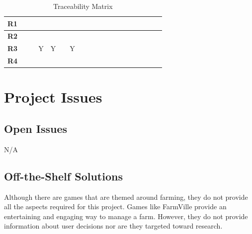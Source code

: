 \documentclass{article}
\begin{document}
\begin{table}[H]
\begin{adjustwidth}{-1.87in}{-1in}
\begin{tabular}{c|c|c|c|c|c|c|c|c|c|c|c|c|c|c|c|c|c|c|}
\multicolumn{1}{|c|}{\textbf{R1}}   &              &              &              &              &              &              &              &              &              &              &              &              &              &              &             &             &             &             \\ \hline
\multicolumn{1}{|c|}{\textbf{R2}}   &              &              &              &              &              &              &              &              &              &              &              &              &              &              &             &             &             &             \\ \hline
\multicolumn{1}{|c|}{\textbf{R3}}   &              &              & Y            & Y            &              & Y            &              &              &              &              &              &              &              &              &             &             &             &             \\ \hline
\multicolumn{1}{|c|}{\textbf{R4}}   &              &              &              &              &              &              &              &              &              &              &              &              &              &              &             &             &             &             \\ \hline
\end{tabular}
\caption{Traceability Matrix}
    \label{tab:my_label}
\end{adjustwidth}
\end{table}



\section{Project Issues}

\subsection{Open Issues}
N/A

\subsection{Off-the-Shelf Solutions}
Although there are games that are themed around farming, they do not provide all the aspects required for this project. Games like FarmVille provide an entertaining and engaging way to manage a farm. However, they do not provide information about user decisions nor are they targeted toward research. 
\end{document}
